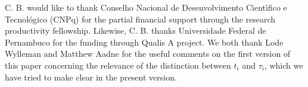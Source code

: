 \documentclass[twocolumn,prd,aps,showpacs,showkeys,amsmath,amssymb]{revtex4-1}
\begin{document}
\vspace{0.5cm}

\begin{acknowledgments}
C. B. would like to thank Conselho Nacional de Desenvolvimento Cient\'{\i}fico e Tecnol\'ogico (CNPq) for the partial financial support through the research productivity fellowship. Likewise,  C. B. thanks Universidade Federal de Pernambuco for the funding through Qualis A project. We both thank Lode Wylleman and Matthew Aadne for the useful comments on the first version of this paper concerning the relevance of the distinction between $t_i$ and $\tau_i$, which we have tried to make clear in the present version.
\end{acknowledgments}











































\end{document}
